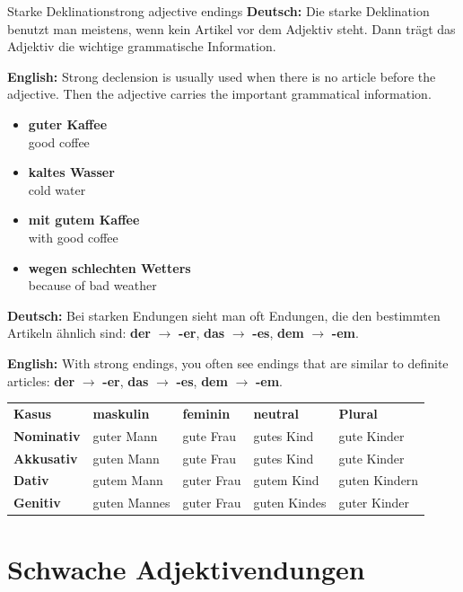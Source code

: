 \documentclass[a4paper,11pt]{article}
\newcommand{\GermanText}[1]{\textbf{Deutsch: }#1\par}
\newcommand{\EnglishText}[1]{{\small\color{SoftGray}\textbf{English: }#1\par}}
\newcommand{\ExampleItem}[2]{\item \textbf{#1}\\{\small\color{SoftGray}#2}}
\begin{document}
\begin{grammarentry}{Starke Deklination}{strong adjective endings}
\GermanText{Die starke Deklination benutzt man meistens, wenn kein Artikel vor dem Adjektiv steht. Dann trägt das Adjektiv die wichtige grammatische Information.}
\EnglishText{Strong declension is usually used when there is no article before the adjective. Then the adjective carries the important grammatical information.}

\begin{exbox}
\begin{itemize}
    \ExampleItem{guter Kaffee}{good coffee}
    \ExampleItem{kaltes Wasser}{cold water}
    \ExampleItem{mit gutem Kaffee}{with good coffee}
    \ExampleItem{wegen schlechten Wetters}{because of bad weather}
\end{itemize}
\end{exbox}

\GermanText{Bei starken Endungen sieht man oft Endungen, die den bestimmten Artikeln ähnlich sind: \textbf{der} $\rightarrow$ \textbf{-er}, \textbf{das} $\rightarrow$ \textbf{-es}, \textbf{dem} $\rightarrow$ \textbf{-em}.}
\EnglishText{With strong endings, you often see endings that are similar to definite articles: \textbf{der} $\rightarrow$ \textbf{-er}, \textbf{das} $\rightarrow$ \textbf{-es}, \textbf{dem} $\rightarrow$ \textbf{-em}.}
\end{grammarentry}

\begin{center}
\begin{tabular}{>{\bfseries}p{2.5cm}p{3cm}p{3cm}p{3cm}p{3cm}}
\rowcolor{HeaderBlueDark}
\color{white}\textbf{Kasus} & \color{white}\textbf{maskulin} & \color{white}\textbf{feminin} & \color{white}\textbf{neutral} & \color{white}\textbf{Plural} \\
Nominativ & guter Mann & gute Frau & gutes Kind & gute Kinder \\
Akkusativ & guten Mann & gute Frau & gutes Kind & gute Kinder \\
Dativ & gutem Mann & guter Frau & gutem Kind & guten Kindern \\
Genitiv & guten Mannes & guter Frau & guten Kindes & guter Kinder \\
\end{tabular}
\end{center}

\section{Schwache Adjektivendungen}
\end{document}
